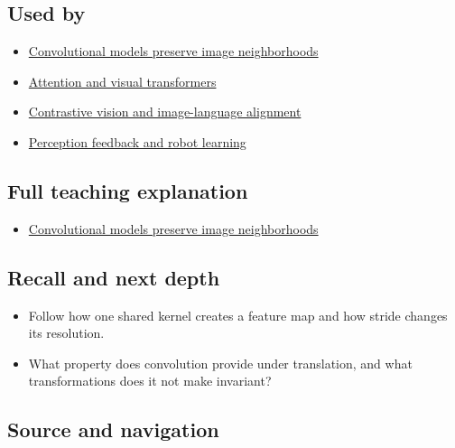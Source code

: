 \subsection{Used by}\label{appendix-47c51ea026fb-used-by}

\begin{itemize}
\tightlist
\item
  \hyperref[04-visual-computing-ii-ch031-convolutional-models-preserve-image-neighborhoods]{Convolutional models preserve image neighborhoods}
\item
  \hyperref[appendix-a9d5dfdd164a]{Attention and visual transformers}
\item
  \hyperref[appendix-772f1fd96148]{Contrastive vision and image-language alignment}
\item
  \hyperref[appendix-b0c42da325f1]{Perception feedback and robot learning}
\end{itemize}

\subsection{Full teaching explanation}\label{appendix-47c51ea026fb-full-teaching-explanation}

\begin{itemize}
\tightlist
\item
  \hyperref[04-visual-computing-ii-ch031-convolutional-models-preserve-image-neighborhoods]{Convolutional models preserve image neighborhoods}
\end{itemize}

\subsection{Recall and next depth}\label{appendix-47c51ea026fb-recall-and-next-depth}

\begin{itemize}
\tightlist
\item
  Follow how one shared kernel creates a feature map and how stride changes its resolution.
\item
  What property does convolution provide under translation, and what transformations does it not make invariant?
\end{itemize}

\subsection{Source and navigation}\label{appendix-47c51ea026fb-source-and-navigation}

